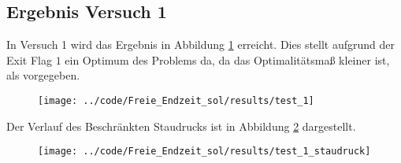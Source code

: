 \subsection{Ergebnis Versuch 1}\label{kap:Versuch1_OptTf}
In Versuch 1 wird das Ergebnis in Abbildung \ref{img:test_1_OptTf} erreicht. Dies stellt aufgrund der Exit Flag $1$ ein Optimum des Problems da, da das Optimalitätsmaß kleiner ist, als vorgegeben.
\begin{figure}[H]
\begin{center}
\texttt{[image: ../code/Freie\_Endzeit\_sol/results/test\_1]}
\label{img:test_1_OptTf}
\end{center}
\end{figure}
Der Verlauf des Beschränkten Staudrucks ist in Abbildung \ref{img:test_1_staudruck_OptTf} dargestellt.
\begin{figure}[H]
\begin{center}
\texttt{[image: ../code/Freie\_Endzeit\_sol/results/test\_1\_staudruck]}
\label{img:test_1_staudruck_OptTf}
\end{center}
\end{figure}